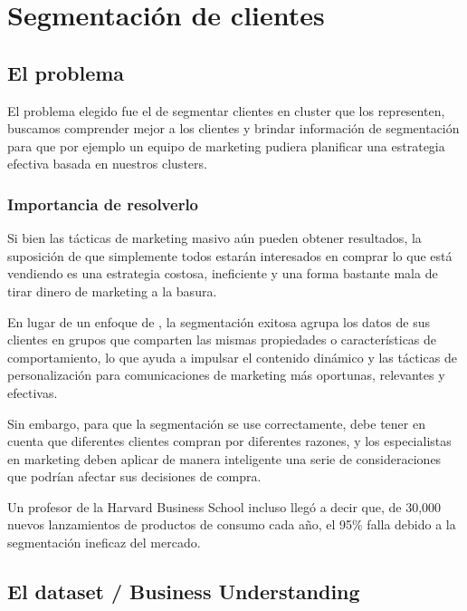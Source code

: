 \documentclass[12pt, fleqn]{report}                             %
\newcommand \Quote              {\qq}                           %
\theoremstyle{break}                                            %
\begin{document}
\part{Segmentación de clientes}

    \chapter{El problema}

        El problema elegido fue el de segmentar clientes en cluster que los representen, buscamos comprender mejor a los
        clientes y brindar información de segmentación para que por ejemplo un equipo de marketing pudiera planificar
        una estrategia efectiva basada en nuestros clusters.

        \section{Importancia de resolverlo}

        Si bien las tácticas de marketing masivo aún pueden obtener resultados, 
        la suposición de que simplemente todos estarán interesados en comprar lo que está vendiendo es una 
        estrategia costosa, ineficiente y una forma bastante mala de tirar dinero de marketing a la basura.

        En lugar de un enfoque de \Quote{talla única}, la segmentación exitosa agrupa los datos de sus 
        clientes en grupos que comparten las mismas propiedades o características de comportamiento, 
        lo que ayuda a impulsar el contenido dinámico y las tácticas de personalización para comunicaciones 
        de marketing más oportunas, relevantes y efectivas.

        Sin embargo, para que la segmentación se use correctamente, debe tener en cuenta que 
        diferentes clientes compran por diferentes razones, y los especialistas en marketing 
        deben aplicar de manera inteligente una serie de consideraciones que podrían afectar 
        sus decisiones de compra. 
        
        Un profesor de la Harvard Business School incluso llegó a decir que, de 30,000 nuevos lanzamientos 
        de productos de consumo cada año, el 95\% falla debido a la segmentación ineficaz del mercado.

        \cite{3}

    \chapter{El dataset / Business Understanding}
\end{document}

